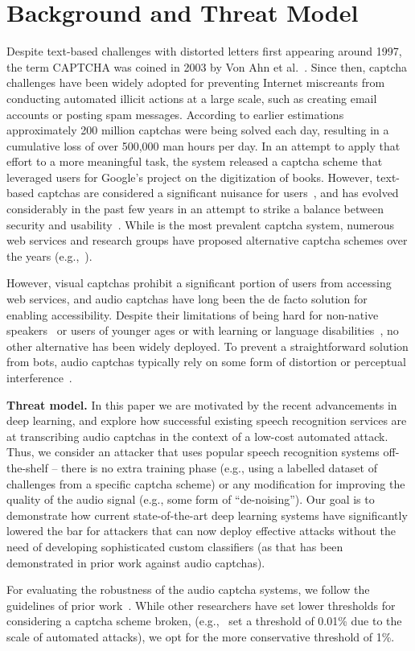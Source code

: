 \section{Background and Threat Model}
\label{sec:background}

Despite text-based challenges with distorted letters first appearing around 1997,
the term CAPTCHA was coined in 2003 by Von Ahn et al.~\cite{captcha}. Since 
then, captcha challenges have been widely adopted for preventing Internet 
miscreants from conducting automated illicit actions at a large scale, such as 
creating email accounts or posting spam messages. According to earlier estimations~\cite{captcha_stats}
approximately 200 million captchas were being solved each day, resulting in a
cumulative loss of over 500,000 man hours per day. In an attempt to apply that 
effort to a more meaningful task, the \re system released a captcha scheme that
leveraged users for Google's project on the digitization of books. However, 
text-based captchas are considered a significant nuisance for users~\cite{scientific_american},
and \re has evolved considerably in the past few years in an attempt to strike 
a balance between security and usability~\cite{recaptcha}. While \re is the
most prevalent captcha system, numerous web services and research groups have 
proposed alternative captcha schemes over the years (e.g.,~\cite{Chew04,asirra,dcaptcha}).

However, visual captchas prohibit a significant portion of users from accessing 
web services, and audio captchas have long been the de facto solution for
enabling accessibility. Despite their limitations of being hard for
non-native speakers~\cite{yan2008usability} or users of younger ages 
or with learning or language disabilities~\cite{schlaikjer2007dual},
no other alternative has been widely deployed.
To prevent a straightforward solution from bots, audio captchas 
typically rely on some form of distortion or perceptual interference~\cite{shinn2008object}.

\textbf{Threat model.} In this paper we are motivated by the recent advancements 
in deep learning, and explore how successful existing speech recognition services
are at transcribing audio captchas in the context of a low-cost automated attack.
Thus, we consider an attacker that uses popular speech recognition systems off-the-shelf --
there is no extra training phase (e.g., using a labelled dataset of challenges from 
a specific captcha scheme) or any modification for improving the quality of the audio 
signal (e.g., some form of ``de-noising''). Our goal is to demonstrate how current 
state-of-the-art deep learning systems have significantly lowered the bar for attackers
that can now deploy effective attacks without the need of developing sophisticated 
custom classifiers (as that has been demonstrated in prior work against audio captchas).

For evaluating the robustness of the 
audio captcha systems, we follow the guidelines of prior work~\cite{bursztein2011failure}.
While other researchers have set lower thresholds for considering a captcha scheme 
broken, (e.g.,~\cite{Chellapilla} set a threshold of 0.01\% due to the scale of 
automated attacks), we opt for the more conservative threshold of 1\%.
